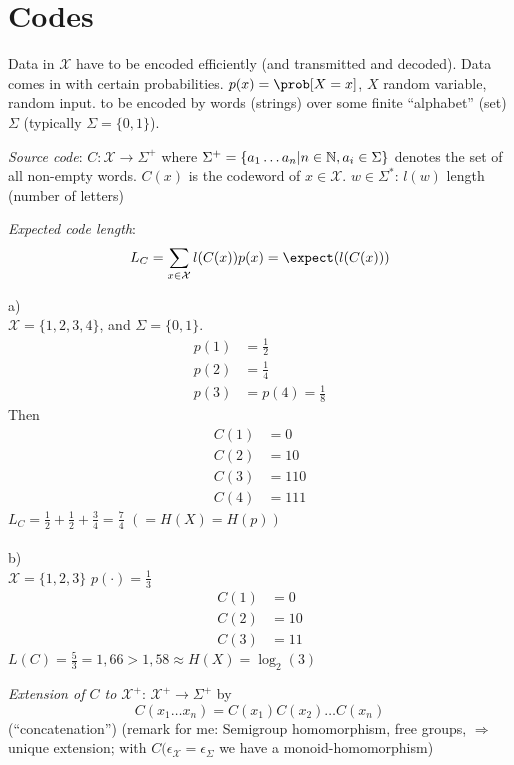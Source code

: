 \documentclass[mfit.tex]{subfiles}
\begin{document}
\section{Codes}

Data in $\mathcal{X}$ have to be encoded efficiently (and transmitted and decoded).
Data comes in with certain probabilities. $p(x) = \prob[X=x]$, $X$ random variable, random input.
to be encoded by words (strings) over some finite \enquote{alphabet} (set) $\Sigma$ (typically $\Sigma = \{0,1\}$).

\begin{defi*}
  \emph{Source code}: $C: \mathcal{X} \to \Sigma^+$ where $\Sigma^+ = \{a_1 \dots a_n | n \in \mathbb{N}, a_i \in \Sigma\}$ denotes the set of all non-empty words.
  $C(x)$ is the codeword of $x \in \mathcal{X}$.
  $w \in \Sigma^\ast$: $l(w)$ length (number of letters)
  
  \emph{Expected code length}: \[ L_C = \sum_{x \in \mathcal{X}} l(C(x)) p(x) = \expect(l(C(x))) \]
\end{defi*}

\begin{ex}
  a)\\
  $\mathcal{X} = \{1,2,3,4\}$, and $\Sigma = \{0,1\}$.
  \begin{align*}
    p(1) &= \frac{1}{2} \\
    p(2) &= \frac{1}{4} \\
    p(3) &= p(4) = \frac{1}{8}
  \end{align*}
  Then 
  \begin{align*}
    C(1) &= 0 \\
    C(2) &= 10 \\
    C(3) &= 110 \\
    C(4) &= 111
  \end{align*}
  $L_C = \frac{1}{2} + \frac{1}{2} + \frac{3}{4} = \frac{7}{4}$ $(= H(X) = H(p))$
  \\
  \\
  b)\\
  $\mathcal{X} = \{1,2,3\}$
  $p(\cdot) = \frac{1}{3}$
  \begin{align*}
    C(1) &= 0 \\
    C(2) &= 10 \\
    C(3) &= 11
  \end{align*}
  $L(C) = \frac{5}{3} = 1,66 > 1,58 \approx H(X) = \log_2(3)$
\end{ex}

\begin{defi*}
  \emph{Extension of $C$ to $\mathcal{X}^+$}: $\mathcal{X}^+ \to \Sigma^+$ by
  \[ C(x_1 \dots x_n) = C(x_1)C(x_2)\dots C(x_n) \]
  (\enquote{concatenation})
  (remark for me: Semigroup homomorphism, free groups, $\Rightarrow$ unique extension; with $C(\epsilon_\mathcal{X} = \epsilon_\Sigma$ we have a monoid-homomorphism)
\end{defi*}
\end{document}
